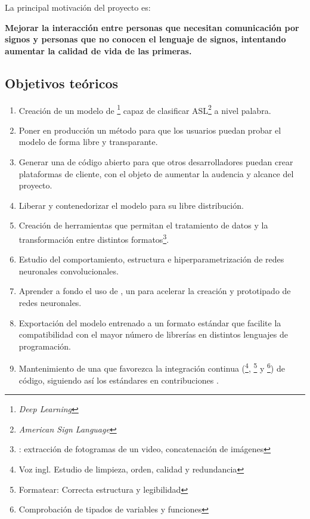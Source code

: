
La principal motivación del proyecto es:

\textbf{
  Mejorar la interacción entre personas que necesitan comunicación por signos y personas que no conocen el lenguaje de signos, intentando aumentar la calidad de vida de las primeras.
}


\subsection{Objetivos teóricos}

\begin{enumerate}
  \item Creación de un modelo de \footnote{\textit{Deep Learning}} capaz de clasificar ASL\footnote{\textit{American Sign Language}} a nivel palabra.
  \item Poner en producción un método para que los usuarios puedan probar el modelo de forma libre y transparante.
  \item Generar una  de código abierto para que otros desarrolladores puedan crear plataformas de cliente, con el objeto de aumentar la audencia y alcance del proyecto.
  \item Liberar y contenedorizar el modelo para su libre distribución.
  \item Creación de herramientas que permitan el tratamiento de datos y la transformación entre distintos formatos\footnote{\pe: extracción de fotogramas de un video, concatenación de imágenes}.
  \item Estudio del comportamiento, estructura e hiperparametrización de redes neuronales convolucionales.
  \item Aprender a fondo el uso de \cite{PYTORCH}, un  para acelerar la creación y prototipado de redes neuronales.
  \item Exportación del modelo entrenado a un formato estándar que facilite la compatibilidad con el mayor número de librerías en distintos lenguajes de programación.
  \item Mantenimiento de una  que favorezca la integración continua (\footnote{Voz ingl. Estudio de limpieza, orden, calidad y redundancia}, \footnote{Formatear: Correcta estructura y legibilidad} y \footnote{Comprobación de tipados de variables y funciones}) de código, siguiendo así los estándares en contribuciones .
\end{enumerate}


